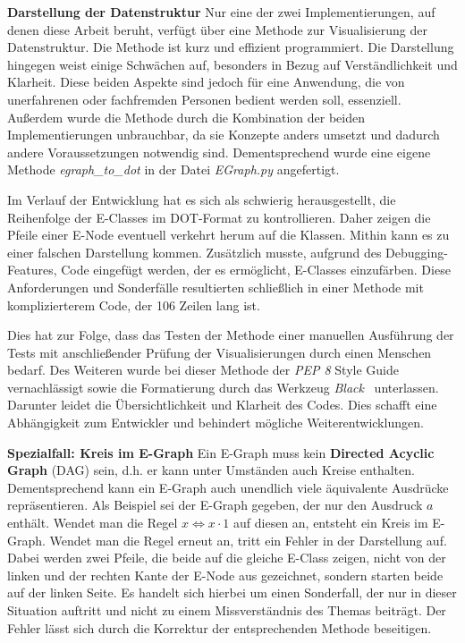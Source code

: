 \noindent\textbf{Darstellung der Datenstruktur} Nur eine der zwei Implementierungen, auf denen diese Arbeit beruht, verfügt über eine Methode zur Visualisierung der Datenstruktur.
Die Methode ist kurz und effizient programmiert. Die Darstellung hingegen weist einige Schwächen auf, besonders in Bezug auf Verständlichkeit und Klarheit.
Diese beiden Aspekte sind jedoch für eine Anwendung, die von unerfahrenen oder fachfremden Personen bedient werden soll, essenziell.
Außerdem wurde die Methode durch die Kombination der beiden Implementierungen unbrauchbar, da sie Konzepte anders umsetzt und dadurch andere Voraussetzungen notwendig sind.
Dementsprechend wurde eine eigene Methode \textit{egraph\_to\_dot} in der Datei \textit{EGraph.py} angefertigt.

Im Verlauf der Entwicklung hat es sich als schwierig herausgestellt, die Reihenfolge der E-Classes im DOT-Format zu kontrollieren.
Daher zeigen die Pfeile einer E-Node eventuell verkehrt herum auf die Klassen. Mithin kann es zu einer falschen Darstellung kommen.
Zusätzlich musste, aufgrund des Debugging-Features, Code eingefügt werden, der es ermöglicht, E-Classes einzufärben.
Diese Anforderungen und Sonderfälle resultierten schließlich in einer Methode mit komplizierterem Code, der 106 Zeilen lang ist.

Dies hat zur Folge, dass das Testen der Methode einer manuellen Ausführung der Tests mit anschließender Prüfung der Visualisierungen durch einen Menschen bedarf.
Des Weiteren wurde bei dieser Methode der \textit{PEP 8} Style Guide~\cite{pep} vernachlässigt sowie die Formatierung durch das Werkzeug \textit{Black}~\cite{black} unterlassen.
Darunter leidet die Übersichtlichkeit und Klarheit des Codes. Dies schafft eine Abhängigkeit zum Entwickler und behindert mögliche Weiterentwicklungen.

\noindent\textbf{Spezialfall: Kreis im E-Graph} Ein E-Graph muss kein \textbf{Directed Acyclic Graph} (DAG) sein, d.h. er kann unter Umständen auch Kreise enthalten. 
Dementsprechend kann ein E-Graph auch unendlich viele äquivalente Ausdrücke repräsentieren.
Als Beispiel sei der E-Graph gegeben, der nur den Ausdruck $a$ enthält. Wendet man die Regel $x \Leftrightarrow x \cdot 1$ auf diesen an, entsteht ein Kreis im E-Graph.
Wendet man die Regel erneut an, tritt ein Fehler in der Darstellung auf. Dabei werden zwei Pfeile, die beide auf die gleiche E-Class zeigen, nicht von der linken und der rechten
Kante der E-Node aus gezeichnet, sondern starten beide auf der linken Seite. Es handelt sich hierbei um einen Sonderfall, der nur in dieser Situation auftritt und nicht zu einem 
Missverständnis des Themas beiträgt. Der Fehler lässt sich durch die Korrektur der entsprechenden Methode beseitigen.

